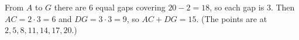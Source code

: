 From $A$ to $G$ there are $6$ equal gaps covering $20-2=18$, so each gap is $3$. Then $AC=2\cdot3=6$ and $DG=3\cdot3=9$, so $AC+DG=\boxed{15}$. (The points are at $2,5,8,11,14,17,20$.)
